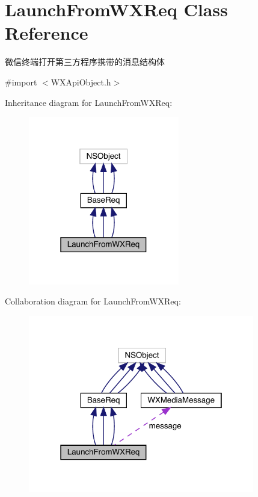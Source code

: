 \hypertarget{interface_launch_from_w_x_req}{}\section{Launch\+From\+W\+X\+Req Class Reference}
\label{interface_launch_from_w_x_req}


微信终端打开第三方程序携带的消息结构体  




{\ttfamily \#import $<$W\+X\+Api\+Object.\+h$>$}



Inheritance diagram for Launch\+From\+W\+X\+Req\+:\nopagebreak
\begin{figure}[H]
\begin{center}
\leavevmode
\includegraphics[width=187pt]{interface_launch_from_w_x_req__inherit__graph}
\end{center}
\end{figure}


Collaboration diagram for Launch\+From\+W\+X\+Req\+:\nopagebreak
\begin{figure}[H]
\begin{center}
\leavevmode
\includegraphics[width=280pt]{interface_launch_from_w_x_req__coll__graph}
\end{center}
\end{figure}
